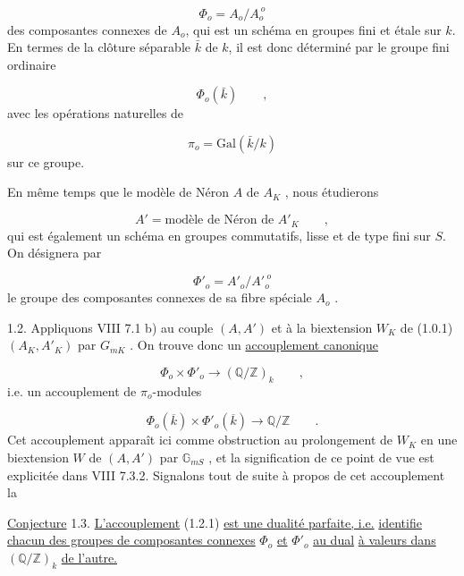 \begin{equation}\tag{1.1.5}
\Phi_o = A_o/A_o^{\ o}
\end{equation}
des composantes connexes de $A_o$, qui est un schéma en groupes fini et étale sur $k$. En termes de la clôture séparable $\bar{k}$ de $k$, il est donc déterminé par le groupe fini ordinaire

\begin{equation}\tag{1.1.6}
\Phi_o(\bar{k}) \qquad ,
\end{equation}
avec les opérations naturelles de

\begin{equation*}
\pi_o = \mathrm{Gal}(\bar{k}/k)
\end{equation*}
sur ce groupe.

En même temps que le modèle de Néron $A$ de $A_K$ , nous étudierons

\begin{equation}\tag{1.1.7}
A' = \text{modèle de Néron de } A'_K \qquad ,
\end{equation}
qui est également un schéma en groupes commutatifs, lisse et de type fini sur $S$. On désignera par

\begin{equation}\tag{1.1.8}
\Phi'_o = A'_o/{A'}_o^{\ o}
\end{equation}
le groupe des composantes connexes de sa fibre spéciale $A_o$ .



1.2. Appliquons VIII 7.1 b) au couple $(A,A')$ et à la biextension $W_K$ de (1.0.1) $(A_K,A'_K)$ par $G_{mK}$ . On trouve donc un \underline{accouplement canonique}

\begin{equation}\tag{1.2.1}
\Phi_o \times \Phi'_o \longrightarrow (\mathbb{Q}/\mathbb{Z})_k \qquad ,
\end{equation}
i.e. un accouplement de $\pi_o$-modules

\begin{equation}\tag{1.2.2}
\Phi_o(\overline{k}) \times \Phi'_o(\overline{k}) \longrightarrow \mathbb{Q}/\mathbb{Z} \qquad .
\end{equation}
Cet accouplement apparaît ici comme obstruction au prolongement de $W_K$ en une biextension $W$ de $(A,A')$ par $\mathbb{G}_{mS}$ , et la signification de ce point de vue est explicitée dans VIII 7.3.2. Signalons tout de suite à propos de cet accouplement la

\underline{Conjecture} 1.3. \underline{L'accouplement} (1.2.1) \underline{est une dualité parfaite, i.e.} \underline{identifie chacun des groupes de composantes connexes} $\Phi_o$ \underline{et} $\Phi'_o$ \underline{au dual} \underline{à valeurs dans} $(\mathbb{Q}/\mathbb{Z})_k$ \underline{de l'autre.}

